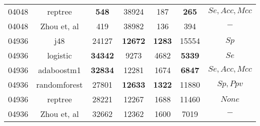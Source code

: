 \begin{table}[h]
\begin{center}
\begin{threeparttable}
\begin{tabular}{c c c c c c c}
    04048 & reptree & \textbf{548} & 38924 & 187 & \textbf{265} & $Se, Acc, Mcc$ \\
    04048 & Zhou et, al & 419 & 38982 & 136 & 394 & $-$ \\
    \hline
    04936 & j48 & 24127 & \textbf{12672} & \textbf{1283} & 15554 & $Sp$ \\
    04936 & logistic & \textbf{34342} & 9273 & 4682 & \textbf{5339} & $Se$ \\
    04936 & adaboostm1 & \textbf{32834} & 12281 & 1674 & \textbf{6847} & $Se, Acc, Mcc$ \\
    04936 & randomforest & 27801 & \textbf{12633} & \textbf{1322} & 11880 & $Sp, Ppv$ \\
    04936 & reptree & 28221 & 12267 & 1688 & 11460 & $None$ \\
    04936 & Zhou et, al & 32662 & 12362 & 1600 & 7019 & $-$ \\
  \bottomrule
\end{tabular}
\end{threeparttable}
\end{center}
\end{table}
